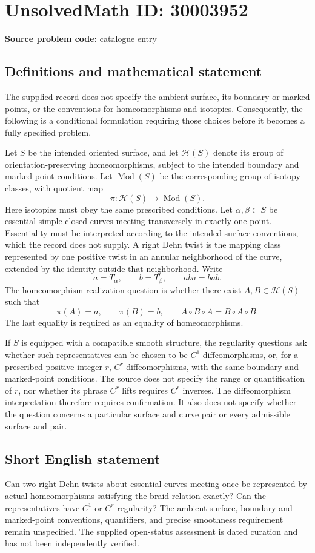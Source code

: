 \documentclass[11pt]{article}
\begin{document}
\section*{UnsolvedMath ID: 30003952}
\textbf{Source problem code:} catalogue entry
\subsection{Definitions and mathematical statement}
The supplied record does not specify the ambient surface, its boundary or marked points, or the conventions for homeomorphisms and isotopies. Consequently, the following is a conditional formulation requiring those choices before it becomes a fully specified problem.

Let \(S\) be the intended oriented surface, and let \(\mathcal H(S)\) denote its group of orientation-preserving homeomorphisms, subject to the intended boundary and marked-point conditions. Let \(\operatorname{Mod}(S)\) be the corresponding group of isotopy classes, with quotient map
\[
\pi\colon\mathcal H(S)\longrightarrow\operatorname{Mod}(S).
\]
Here isotopies must obey the same prescribed conditions. Let \(\alpha,\beta\subset S\) be essential simple closed curves meeting transversely in exactly one point. Essentiality must be interpreted according to the intended surface conventions, which the record does not supply. A right Dehn twist is the mapping class represented by one positive twist in an annular neighborhood of the curve, extended by the identity outside that neighborhood. Write
\[
a=T_\alpha,\qquad b=T_\beta,\qquad aba=bab.
\]
The homeomorphism realization question is whether there exist \(A,B\in\mathcal H(S)\) such that
\[
\pi(A)=a,\qquad \pi(B)=b,\qquad
A\circ B\circ A=B\circ A\circ B.
\]
The last equality is required as an equality of homeomorphisms.

If \(S\) is equipped with a compatible smooth structure, the regularity questions ask whether such representatives can be chosen to be \(C^1\) diffeomorphisms, or, for a prescribed positive integer \(r\), \(C^r\) diffeomorphisms, with the same boundary and marked-point conditions. The source does not specify the range or quantification of \(r\), nor whether its phrase \(C^r\) lifts requires \(C^r\) inverses. The diffeomorphism interpretation therefore requires confirmation. It also does not specify whether the question concerns a particular surface and curve pair or every admissible surface and pair.
\subsection{Short English statement}
Can two right Dehn twists about essential curves meeting once be represented by actual homeomorphisms satisfying the braid relation exactly? Can the representatives have \(C^1\) or \(C^r\) regularity? The ambient surface, boundary and marked-point conventions, quantifiers, and precise smoothness requirement remain unspecified. The supplied open-status assessment is dated curation and has not been independently verified.
\end{document}

